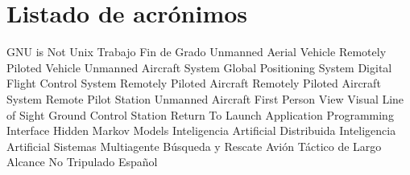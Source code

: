 \chapter{Listado de acrónimos}

{\small
\begin{acronym}[TFG]
       {\acs{GNU} is Not Unix}
       {Trabajo Fin de Grado}
       {Unmanned Aerial Vehicle}
       {Remotely Piloted Vehicle}
       {Unmanned Aircraft System}
       {Global Positioning System}
      {Digital Flight Control System}
       {Remotely Piloted Aircraft}
      {Remotely Piloted Aircraft System}
       {Remote Pilot Station}
        {Unmanned Aircraft} 
       {First Person View}
      {Visual Line of Sight} 
       {Ground Control Station}
       {Return To Launch}
       {Application Programming Interface}
       {Hidden Markov Models}
       {Inteligencia Artificial Distribuida}
  	 {Inteligencia Artificial}
  	 {Sistemas Multiagente}
       {Búsqueda y Rescate}
   {Avión Táctico de Largo Alcance No Tripulado Español}
\end{acronym}
}




